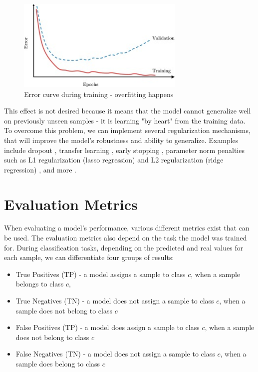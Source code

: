 \begin{figure}[H]
\begin{centering}
\includegraphics[width=8cm]{assets/images/overfitting.jpg}
\par\end{centering}
\caption{Error curve during training - overfitting happens \cite{Santosh2022-2}}
\label{fig:overfitting}
\end{figure}

This effect is not desired because it means that the model cannot generalize well on previously unseen samples - it is learning "by heart" from the training data. To overcome this problem, we can implement several regularization mechanisms, that will improve the model's robustness and ability to generalize. Examples include dropout \cite{Srivastava2014}, transfer learning \cite{Pan2009}, early stopping \cite{Sarle1996}, parameter norm penalties such as L1 regularization (lasso regression) and L2 regularization (ridge regression) \cite{Krogh1991}, and more \cite{Santosh2022-2}.



\section{Evaluation Metrics}
When evaluating a model's performance, various different metrics exist that can be used. The evaluation metrics also depend on the task the model was trained for. During classification tasks, depending on the predicted and real values for each sample, we can differentiate four groups of results:

\begin{itemize}
    \item True Positives (TP) - a model assigns a sample to class $c$, when a sample belongs to class $c$,
    \item True Negatives (TN) - a model does not assign a sample to class $c$, when a sample does not belong to class $c$
    \item False Positives (TP) - a model does assign a sample to class $c$, when a sample does not belong to class $c$
    \item False Negatives (TN) - a model does not assign a sample to class $c$, when a sample does belong to class $c$
\end{itemize}

